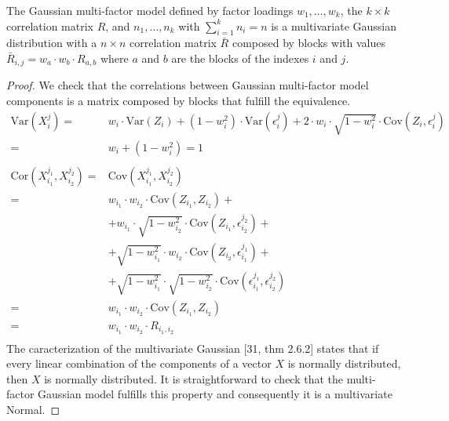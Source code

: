 \documentclass[11pt,fleqn]{book} %
\begin{document}
\begin{proposition}
\label{prop:gmfigs}
The Gaussian multi-factor model defined by factor loadings 
$w_1,\dots,w_k$, the $k \times k$ correlation matrix $R$, and
$n_1,\dots,n_k$ with $\sum_{i=1}^k n_i = n$ is a 
multivariate Gaussian distribution with a $n \times n$ correlation
matrix $\bar{R}$ composed by blocks with values
$\bar{R}_{i,j} = w_a \cdot w_b \cdot R_{a,b}$ where $a$ and $b$ 
are the blocks of the indexes $i$ and $j$.
\end{proposition}
\begin{proof}
We check that the correlations between Gaussian multi-factor model
components is a matrix composed by blocks that fulfill the equivalence.
\begin{displaymath}
\begin{array}{rl}
\textrm{Var}(X_i^j) = &
  w_i \cdot \textrm{Var}(Z_i) + (1-w_i^2) \cdot \textrm{Var}(\epsilon_i^j) +
  2 \cdot w_i \cdot \sqrt{1-w_i^2} \cdot \textrm{Cov}(Z_i, \epsilon_i^j) \\
= & w_i + (1-w_i^2) = 1 \\
 & \\
\textrm{Cor}(X_{i_1}^{j_1},X_{i_2}^{j_2}) = & \textrm{Cov}(X_{i_1}^{j_1},X_{i_2}^{j_2}) \\
= & w_{i_1} \cdot w_{i_2} \cdot \textrm{Cov}(Z_{i_1},Z_{i_2}) + \\
&   + w_{i_1} \cdot \sqrt{1-w_{i_2}^2} \cdot \textrm{Cov}(Z_{i_1}, \epsilon_{i_2}^{j_2}) + \\
&   + \sqrt{1-w_{i_1}^2} \cdot w_{i_2} \cdot \textrm{Cov}(Z_{i_2}, \epsilon_{i_1}^{j_1}) + \\
&   + \sqrt{1-w_{i_1}^2} \cdot \sqrt{1-w_{i_2}^2} \cdot \textrm{Cov}(\epsilon_{i_1}^{j_1}, \epsilon_{i_2}^{j_2}) \\
= & w_{i_1} \cdot w_{i_2} \cdot \textrm{Cov}(Z_{i_1}, Z_{i_2}) \\
= & w_{i_1} \cdot w_{i_2} \cdot R_{i_1,i_2} \\
\end{array}
\end{displaymath}
The caracterization of the multivariate Gaussian [31, thm 2.6.2]
states that if every linear combination of the components of a 
vector $X$ is normally distributed, then $X$ is normally distributed.
It is straightforward to check that the multi-factor Gaussian model 
fulfills this property and consequently it is a multivariate Normal.
\end{proof}
\end{document}
